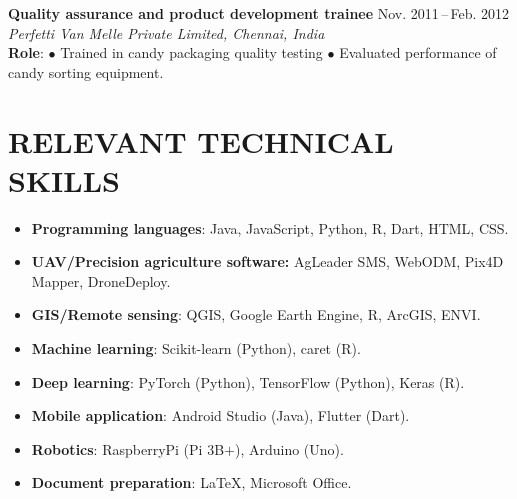 \documentclass[11pt]{article}
\newcommand\experience[4]{\textbf{#1}  \hfill {#2}\\ {\textit{#3}}\\ {\textbf{Role}: #4} \vspace{-5pt}}
\begin{document}
\experience{Quality assurance and product development trainee}{Nov. 2011\,--\,Feb. 2012}{Perfetti Van Melle Private Limited, Chennai, India}{$\bullet$ Trained in candy packaging quality testing $\bullet$ Evaluated performance of candy sorting equipment.}

\newpage
\section*{RELEVANT TECHNICAL SKILLS}
\begin{itemize}[itemsep=-0.8ex]
\item \textbf{Programming languages}: Java, JavaScript, Python, R, Dart, HTML, CSS.\\
\item \textbf{UAV/Precision agriculture software:} AgLeader SMS, WebODM, Pix4D Mapper, DroneDeploy. \\
\item \textbf{GIS/Remote sensing}: QGIS, Google Earth Engine, R, ArcGIS, ENVI. \\
\item \textbf{Machine learning}: Scikit-learn (Python), caret (R). \\ 
\item \textbf{Deep learning}: PyTorch (Python), TensorFlow (Python), Keras (R). \\ 
\item \textbf{Mobile application}: Android Studio (Java), Flutter (Dart). \\
\item \textbf{Robotics}: RaspberryPi (Pi 3B$+$), Arduino (Uno). \\
\item \textbf{Document preparation}: \LaTeX , Microsoft Office.\\
\end{itemize} 

\end{document}
